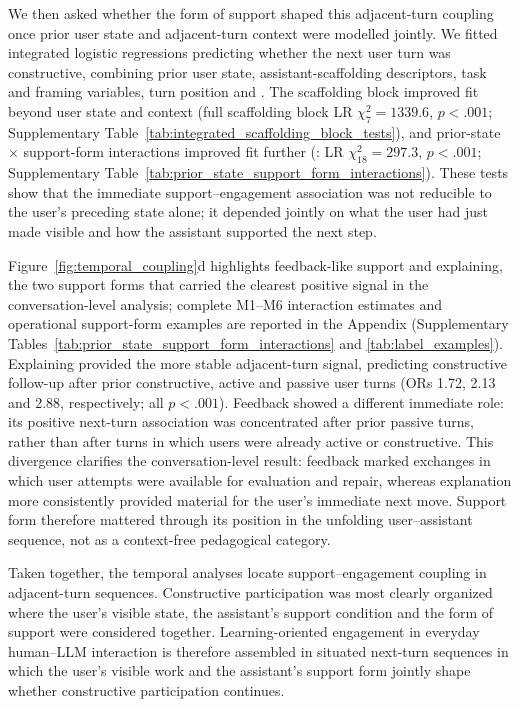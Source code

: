 We then asked whether the form of support shaped this adjacent-turn coupling once prior user state and adjacent-turn context were modelled jointly. We fitted integrated logistic regressions predicting whether the next user turn was constructive, combining prior user state, assistant-scaffolding descriptors, task and framing variables, turn position and . The scaffolding block improved fit beyond user state and context (full scaffolding block LR $\chi^2_7=1339.6$, $p<.001$; Supplementary Table~\ref{tab:integrated_scaffolding_block_tests}), and prior-state $\times$ support-form interactions improved fit further (: LR $\chi^2_{18}=297.3$, $p<.001$; Supplementary Table~\ref{tab:prior_state_support_form_interactions}).  These tests show that the immediate support--engagement association was not reducible to the user's preceding state alone; it depended jointly on what the user had just made visible and how the assistant supported the next step.

Figure~\ref{fig:temporal_coupling}d highlights feedback-like support and explaining, the two support forms that carried the clearest positive signal in the conversation-level analysis; complete M1--M6 interaction estimates and operational support-form examples are reported in the Appendix (Supplementary Tables~\ref{tab:prior_state_support_form_interactions} and \ref{tab:label_examples}). Explaining provided the more stable adjacent-turn signal, predicting constructive follow-up after prior constructive, active and passive user turns (ORs 1.72, 2.13 and 2.88, respectively; all $p<.001$). Feedback showed a different immediate role: its positive next-turn association was concentrated after prior passive turns, rather than after turns in which users were already active or constructive. This divergence clarifies the conversation-level result: feedback marked exchanges in which user attempts were available for evaluation and repair, whereas explanation more consistently provided material for the user's immediate next move. Support form therefore mattered through its position in the unfolding user--assistant sequence, not as a context-free pedagogical category.



Taken together, the temporal analyses locate support--engagement coupling in adjacent-turn sequences. Constructive participation was most clearly organized where the user's visible state, the assistant's support condition and the form of support were considered together. Learning-oriented engagement in everyday human--LLM interaction is therefore assembled in situated next-turn sequences in which the user's visible work and the assistant's support form jointly shape whether constructive participation continues.

